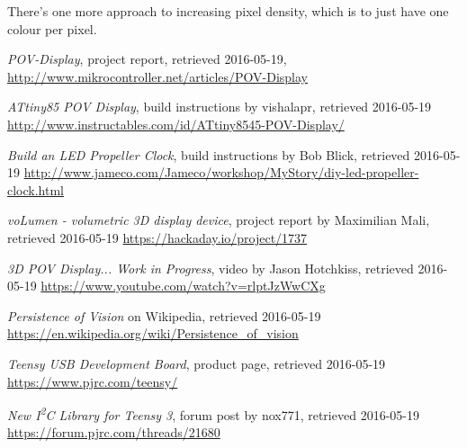 \documentclass[a4paper, 11pt, titlepage]{report}
\def \itwoc {I\textsuperscript{2}C\xspace}
\begin{document}
There's one more approach to increasing pixel density, which is to just have one colour per
pixel.


















\begin{thebibliography}{99}

\emph{POV-Display}, project report, retrieved 2016-05-19,
\newline \url{http://www.mikrocontroller.net/articles/POV-Display}

\emph{ATtiny85 POV Display}, build instructions by vishalapr, retrieved 2016-05-19
\newline \url{http://www.instructables.com/id/ATtiny8545-POV-Display/}

\emph{Build an LED Propeller Clock}, build instructions by Bob Blick, retrieved 2016-05-19
\newline \url{http://www.jameco.com/Jameco/workshop/MyStory/diy-led-propeller-clock.html}

\emph{voLumen - volumetric 3D display device}, project report by Maximilian Mali,
retrieved 2016-05-19
\newline \url{https://hackaday.io/project/1737}

\emph{3D POV Display... Work in Progress}, video by Jason Hotchkiss, retrieved 2016-05-19
\newline \url{https://www.youtube.com/watch?v=rlptJzWwCXg}

\emph{Persistence of Vision} on Wikipedia, retrieved 2016-05-19
\newline \url{https://en.wikipedia.org/wiki/Persistence\_of\_vision}


\emph{Teensy USB Development Board}, product page, retrieved 2016-05-19
\newline \url{https://www.pjrc.com/teensy/}

\emph{New \itwoc Library for Teensy 3}, forum post by nox771, retrieved 2016-05-19
\newline \url{https://forum.pjrc.com/threads/21680}


\end{thebibliography}
\end{document}
